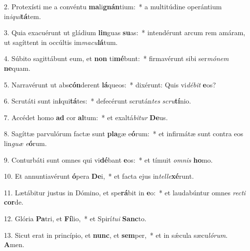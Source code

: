 2. Protexísti me a convéntu \textbf{ma}li\textbf{gnán}tium:~*  a multitúdine operántium in\textit{i}\textit{qui}\textbf{tá}tem.\

3. Quia exacuérunt ut gládium \textbf{lin}guas \textbf{su}as:~*  intendérunt arcum rem amáram, ut sagíttent in occúltis im\textit{ma}\textit{cu}\textbf{lá}tum.\

4. Súbito sagittábunt eum, et \textbf{non} ti\textbf{mé}bunt:~*  firmavérunt sibi ser\textit{mó}\textit{nem} \textbf{ne}quam.\

5. Narravérunt ut abs\textbf{cón}derent \textbf{lá}queos:~*  dixérunt: Quis vi\textit{dé}\textit{bit} \textbf{e}os?\

6. Scrutáti sunt in\textbf{i}qui\textbf{tá}tes:~*  defecérunt scrután\textit{tes} \textit{scru}\textbf{tí}nio.\

7. Accédet homo \textbf{ad} cor \textbf{al}tum:~*  et exaltá\textit{bi}\textit{tur} \textbf{De}us.\

8. Sagíttæ parvulórum factæ sunt \textbf{pla}gæ e\textbf{ó}rum:~*  et infirmátæ sunt contra eos lin\textit{guæ} \textit{e}\textbf{ó}rum.\

9. Conturbáti sunt omnes qui vi\textbf{dé}bant \textbf{e}os:~*  et tímuit \textit{om}\textit{nis} \textbf{ho}mo.\

10. Et annuntiavérunt \textbf{ó}pera \textbf{De}i,~*  et facta ejus in\textit{tel}\textit{le}\textbf{xé}runt.\

11. Lætábitur justus in Dómino, et spe\textbf{rá}bit in \textbf{e}o:~*  et laudabúntur omnes \textit{rec}\textit{ti} \textbf{cor}de.\

12. Glória \textbf{Pa}tri, et \textbf{Fí}lio,~*  et Spirí\textit{tu}\textit{i} \textbf{Sanc}to.\

13. Sicut erat in princípio, et \textbf{nunc}, et \textbf{sem}per,~*  et in sǽcula sæcu\textit{ló}\textit{rum}. \textbf{A}men.\

